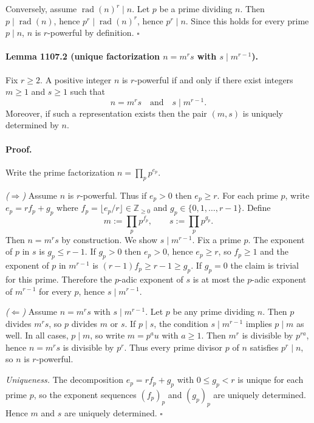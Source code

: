Conversely, assume $\operatorname{rad}(n)^r\mid n$. Let $p$ be a prime dividing $n$. Then $p\mid \operatorname{rad}(n)$, hence $p^r\mid \operatorname{rad}(n)^r$, hence $p^r\mid n$. Since this holds for every prime $p\mid n$, $n$ is $r$-powerful by definition. \hfill $\square$

\paragraph{Lemma 1107.2 (unique factorization $n=m^r s$ with $s\mid m^{r-1}$).}
Fix $r\ge 2$. A positive integer $n$ is $r$-powerful if and only if there exist integers $m\ge 1$ and $s\ge 1$ such that
\[n=m^r s \quad\text{and}\quad s\mid m^{r-1}.\]
Moreover, if such a representation exists then the pair $(m,s)$ is uniquely determined by $n$.

\paragraph{Proof.}
Write the prime factorization $n=\prod_p p^{e_p}$.

\emph{($\Rightarrow$)} Assume $n$ is $r$-powerful. Thus if $e_p>0$ then $e_p\ge r$.
For each prime $p$, write $e_p=r f_p + g_p$ where $f_p=\lfloor e_p/r\rfloor\in\mathbb{Z}_{\ge 0}$ and $g_p\in\{0,1,\dots,r-1\}$.
Define
\[m:=\prod_p p^{f_p},\qquad s:=\prod_p p^{g_p}.
\]
Then $n=m^r s$ by construction.
We show $s\mid m^{r-1}$. Fix a prime $p$. The exponent of $p$ in $s$ is $g_p\le r-1$.
If $g_p>0$ then $e_p>0$, hence $e_p\ge r$, so $f_p\ge 1$ and the exponent of $p$ in $m^{r-1}$ is $(r-1)f_p\ge r-1\ge g_p$.
If $g_p=0$ the claim is trivial for this prime.
Therefore the $p$-adic exponent of $s$ is at most the $p$-adic exponent of $m^{r-1}$ for every $p$, hence $s\mid m^{r-1}$.

\emph{($\Leftarrow$)} Assume $n=m^r s$ with $s\mid m^{r-1}$.
Let $p$ be any prime dividing $n$. Then $p$ divides $m^r s$, so $p$ divides $m$ or $s$.
If $p\mid s$, the condition $s\mid m^{r-1}$ implies $p\mid m$ as well.
In all cases, $p\mid m$, so write $m=p^a u$ with $a\ge 1$. Then $m^r$ is divisible by $p^{ra}$, hence $n=m^r s$ is divisible by $p^r$.
Thus every prime divisor $p$ of $n$ satisfies $p^r\mid n$, so $n$ is $r$-powerful.

\emph{Uniqueness.} The decomposition $e_p=r f_p+g_p$ with $0\le g_p<r$ is unique for each prime $p$, so the exponent sequences $(f_p)_p$ and $(g_p)_p$ are uniquely determined. Hence $m$ and $s$ are uniquely determined. \hfill $\square$

